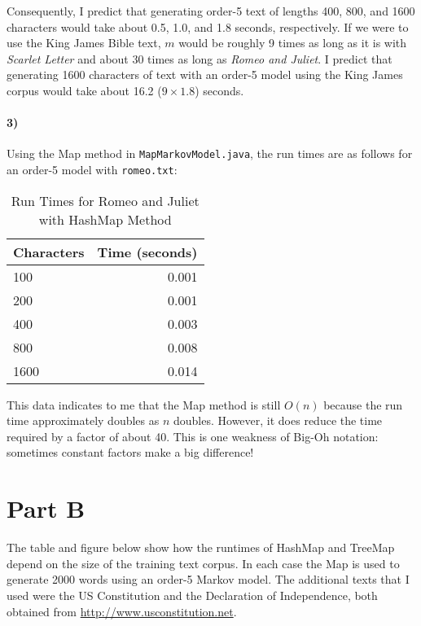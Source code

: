 \documentclass[12pt]{article}
\begin{document}
Consequently, I predict that generating order-5 text of lengths 400, 800, and 1600 characters would take about 0.5, 1.0, and 1.8 seconds, respectively. If we were to use the King James Bible text, $m$ would be roughly 9 times as long as it is with \emph{Scarlet Letter} and about 30 times as long as \emph{Romeo and Juliet}. I predict that generating 1600 characters of text with an order-5 model using the King James corpus would take about 16.2 ($9\times1.8$) seconds. 

\paragraph{3)} Using the Map method in \texttt{MapMarkovModel.java}, the run times are as follows for an order-5 model with \texttt{romeo.txt}:

\begin{table}[h]
\caption{Run Times for Romeo and Juliet with HashMap Method}
\begin{center}
\begin{tabular}{lr}
Characters & Time (seconds) \\
\hline
100 & 0.001 \\
200 & 0.001\\
400 & 0.003 \\
800 & 0.008 \\
1600 & 0.014 \\
\end{tabular}
\end{center}
\end{table}

This data indicates to me that the Map method is still $O(n)$ because the run time approximately doubles as $n$ doubles. However, it does reduce the time required by a factor of about 40. This is one weakness of Big-Oh notation: sometimes constant factors make a big difference! 

\section*{Part B}

The table and figure below show how the runtimes of HashMap and TreeMap depend on the size of the training text corpus. In each case the Map is used to generate 2000 words using an order-5 Markov model. The additional texts that I used were the US Constitution and the Declaration of Independence, both obtained from \url{http://www.usconstitution.net}.
\end{document}
